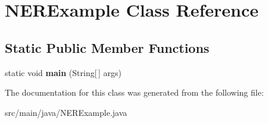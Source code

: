 \hypertarget{classNERExample}{}\section{N\+E\+R\+Example Class Reference}
\label{classNERExample}
\subsection*{Static Public Member Functions}
\begin{DoxyCompactItemize}
\item 
\mbox{\label{classNERExample_a3fabebb0045b2019d41129a07fb0f470}} 
static void {\bfseries main} (String\mbox{[}$\,$\mbox{]} args)
\end{DoxyCompactItemize}


The documentation for this class was generated from the following file\+:\begin{DoxyCompactItemize}
\item 
src/main/java/N\+E\+R\+Example.\+java\end{DoxyCompactItemize}
